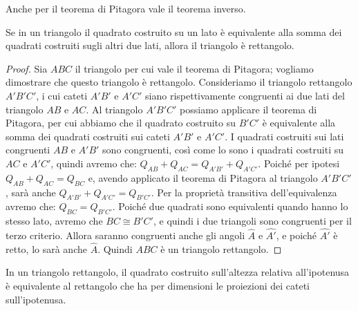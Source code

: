Anche per il teorema di Pitagora vale il teorema inverso.

\begin{teorema}[di Pitagora {[}inverso{]}]
Se in un triangolo il quadrato costruito su un lato  è equivalente alla somma dei quadrati costruiti sugli altri due lati, allora il triangolo è rettangolo.
\end{teorema}

\begin{proof}
Sia $ABC$ il triangolo per cui vale il teorema di Pitagora; vogliamo dimostrare che questo triangolo è rettangolo.
Consideriamo il triangolo rettangolo $A'B'C'$, i cui cateti $A'B'$ e $A'C'$ siano rispettivamente congruenti ai due lati del triangolo $AB$ e $AC$. Al triangolo $A'B'C'$ possiamo applicare il teorema di Pitagora, per cui abbiamo che il quadrato costruito su $B'C'$ è equivalente alla somma dei quadrati costruiti sui cateti $A'B'$ e $A'C'$. I quadrati costruiti sui lati congruenti $AB$ e $A'B'$ sono congruenti, così come lo sono i quadrati costruiti su $AC$ e $A'C'$, quindi avremo che: $Q_{AB} + Q_{AC} = Q_{A'B'} + Q_{A'C'}$. Poiché per ipotesi $Q_{AB} + Q_{AC} = Q_{BC}$ e, avendo applicato il teorema di Pitagora al triangolo $A'B'C'$, sarà anche $Q_{A'B'} + Q_{A'C'} = Q_{B'C'}$. Per la proprietà transitiva dell'equivalenza avremo che: $Q_{BC} = Q_{B'C'}$. Poiché due quadrati sono equivalenti quando hanno lo stesso lato, avremo che $BC\cong B'C'$, e quindi i due triangoli sono congruenti per il terzo criterio. Allora saranno congruenti anche gli angoli $\widehat{A}$ e $\widehat{A'}$, e poiché $\widehat{A'}$ è retto, lo sarà anche $\widehat{A}$. Quindi $ABC$ è un triangolo rettangolo.
\end{proof}

\begin{teorema}
In un triangolo rettangolo, il quadrato costruito sull'altezza relativa all'ipotenusa è equivalente al rettangolo che ha per dimensioni le proiezioni dei cateti sull'ipotenusa.
\end{teorema}

